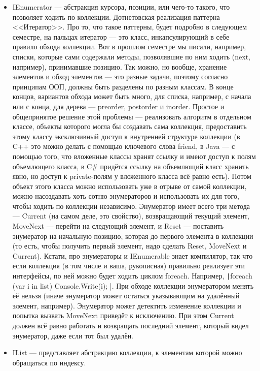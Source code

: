 \documentclass[a5paper]{article}
\begin{document}
\begin{itemize}
    \item IEnumerator --- абстракция курсора, позиции, или чего-то такого, что позволяет ходить по коллекции. Дотнетовская реализация паттерна <<Итератор>>. Про то, что такое паттерны, будет подробно в следующем семестре, на пальцах итератор --- это класс, инкапсулирующий в себе правило обхода коллекции. Вот в прошлом семестре мы писали, например, списки, которые сами содержали методы, позволявшие по ним ходить (next, например), принимавшие позицию. Так можно, но вообще, хранение элементов и обход элементов --- это разные задачи, поэтому согласно принципам ООП, должны быть разделены по разным классам. В конце концов, вариантов обхода может быть много, для списка, например, с начала или с конца, для дерева --- preorder, postorder и inorder. Простое и общепринятое решение этой проблемы --- реализовать алгоритм в отдельном классе, объекты которого могла бы создавать сама коллекция, предоставить этому классу эксклюзивный доступ к внутренней структуре коллекции (в C++ это можно делать с помощью ключевого слова friend, в Java --- с помощью того, что вложенные классы хранят ссылку и имеют доступ к полям объемлющего класса, в C\# придётся ссылку на объемлющий класс хранить явно, но доступ к private-полям у вложенного класса всё равно есть). Потом объект этого класса можно использовать уже в отрыве от самой коллекции, можно насоздавать хоть сотню энумераторов и использовать их для того, чтобы ходить по коллекции независимо. Энумератор имеет всего три метода --- Current (на самом деле, это свойство), возвращающий текущий элемент, MoveNext --- перейти на следующий элемент, и Reset --- поставить энумератор на начальную позицию, которая до первого элемента в коллекции (то есть, чтобы получить первый элемент, надо сделать Reset, MoveNext и Current). Кстати, про энумераторы и IEnumerable знает компилятор, так что если коллекция (в том числе и ваша, рукописная) правильно реализует эти интерфейсы, по ней можно будет ходить циклом foreach. Например, \texttt|foreach (var i in list) { Console.Write(i); }|. При обходе коллекции энумератором менять её нельзя (иначе энумератор может остаться указывающим на удалённый элемент, например). Энумератор может детектить изменение коллекции и попытка вызвать MoveNext приведёт к исключению. При этом Current должен всё равно работать и возвращать последний элемент, который видел энумератор, даже если тот был удалён.
    \item IList --- представляет абстракцию коллекции, к элементам которой можно обращаться по индексу.
\end{itemize}
\end{document}
